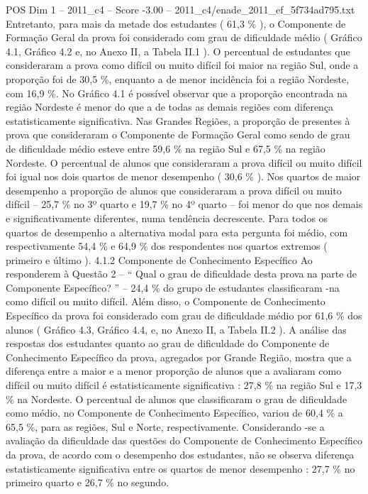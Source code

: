 \begin{textsample}{POS Dim 1 – 2011\_c4 – Score -3.00 – 2011\_c4/enade\_2011\_ef\_5f734ad795.txt}
Entretanto, para mais da metade dos estudantes ( 61,3 \% ), o Componente de Formação Geral da prova foi considerado com grau de dificuldade médio ( Gráfico 4.1, Gráfico 4.2 e, no Anexo II, a Tabela II.1 ).
O percentual de estudantes que consideraram a prova como difícil ou muito difícil foi maior na região Sul, onde a proporção foi de 30,5 \%, enquanto a de menor incidência foi a região Nordeste, com 16,9 \%.
No Gráfico 4.1 é possível observar que a proporção encontrada na região Nordeste é menor do que a de todas as demais regiões com diferença estatisticamente significativa.
Nas Grandes Regiões, a proporção de presentes à prova que consideraram o Componente de Formação Geral como sendo de grau de dificuldade médio esteve entre 59,6 \% na região Sul e 67,5 \% na região Nordeste.
O percentual de alunos que consideraram a prova difícil ou muito difícil foi igual nos dois quartos de menor desempenho ( 30,6 \% ).
Nos quartos de maior desempenho a proporção de alunos que consideraram a prova difícil ou muito difícil – 25,7 \% no 3º quarto e 19,7 \% no 4º quarto – foi menor do que nos demais e significativamente diferentes, numa tendência decrescente.
Para todos os quartos de desempenho a alternativa modal para esta pergunta foi médio, com respectivamente 54,4 \% e 64,9 \% dos respondentes nos quartos extremos ( primeiro e último ). 4.1.2 Componente de Conhecimento Específico Ao responderem à Questão 2 – “ Qual o grau de dificuldade desta prova na parte de Componente Específico? ” – 24,4 \% do grupo de estudantes classificaram -na como difícil ou muito difícil.
Além disso, o Componente de Conhecimento Específico da prova foi considerado com grau de dificuldade médio por 61,6 \% dos alunos ( Gráfico 4.3, Gráfico 4.4, e, no Anexo II, a Tabela II.2 ).
A análise das respostas dos estudantes quanto ao grau de dificuldade do Componente de Conhecimento Específico da prova, agregados por Grande Região, mostra que a diferença entre a maior e a menor proporção de alunos que a avaliaram como difícil ou muito difícil é estatisticamente significativa : 27,8 \% na região Sul e 17,3 \% na Nordeste.
O percentual de alunos que classificaram o grau de dificuldade como médio, no Componente de Conhecimento Específico, variou de 60,4 \% a 65,5 \%, para as regiões, Sul e Norte, respectivamente.
Considerando -se a avaliação da dificuldade das questões do Componente de Conhecimento Específico da prova, de acordo com o desempenho dos estudantes, não se observa diferença estatisticamente significativa entre os quartos de menor desempenho : 27,7 \% no primeiro quarto e 26,7 \% no segundo.

\end{textsample}
